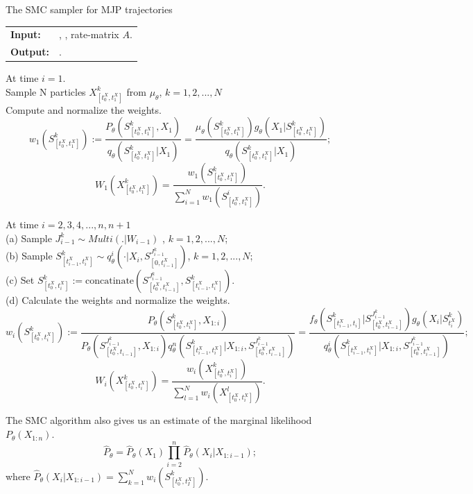 \begin{algorithm}[H]
  \caption{The SMC sampler for MJP trajectories}
   \label{alg:SMC}
  \begin{tabular}{l l}
   \textbf{Input:  } & \text{Prior $\pi_0$, observations $X$}, 
                       \text{Number of particles $N$}, rate-matrix $A$.\\
   \textbf{Output:  }& \text{New MJP trajectory $S' (t) = (s'_0, S', T')$}.\\
   \hline
   \end{tabular}
   \begin{algorithmic}[1]
\State At time $i = 1$.\\
\noindent Sample N particles $X_{[t_0^X, t_1^X]}^k$ from $\mu_\theta$, $k = 1,2,...,N$ \\
\noindent Compute and normalize the weights.
$$w_1(S_{[t_0^X, t_1^X]}^k) :=\frac{P_\theta(S_{[t_0^X, t_1^X]}^k, X_1)}{q_\theta(S_{[t_0^X, t_1^X]}^k|X_1)} =  \frac{\mu_\theta(S_{[t_0^X, t_1^X]}^k)g_\theta(X_1|S_{[t_0^X, t_1^X]}^k)}{q_\theta(S_{[t_0^X, t_1^X]}^k|X_1)};$$
$$W_1(X_{[t_0^X, t_1^X]}^k) = \frac{w_1(S_{[t_0^X, t_1^X]}^k)}{\sum_{i = 1}^N w_1(S_{[t_0^X, t_1^X]}^i)}.$$

\State At time $i = 2, 3, 4,..., n, n + 1$\\
\noindent \noindent (a) Sample $J_{i-1}^k \sim Multi(.| W_{i-1})$ , $k = 1,2,...,N$;\\
\noindent \noindent (b) Sample $S_{[t^X_{i -1},t^X_i]}^k \sim q_\theta^i(\cdot| X_i, S_{[0, t_{i-1}^X]}^{J_{i-1}^k})$, $k = 1,2,...,N$;\\
\noindent \noindent (c) Set $S_{[t_0^X, t^X_i]}^k := \text{concatinate}(S_{[t_0^X, t^X_{i-1}]}^{J_{i-1}^k}, S_{[t_{i -1}^X,t_i^X]}^k)$.\\
\noindent \noindent (d) Calculate the weights and normalize the weights.
$$w_i(S_{[t_0^X, t^X_i]}^k) := \frac{P_\theta(S_{[t_0^X, t_i^X]}^k, X_{1:i})}{P_\theta(S_{[t_0^X,t_{i-1}]}^{J_{i-1}^k}, X_{1:i})q_\theta^n(S_{[t^X_{i-1}, t_i^X]}^k | X_{1:i},S_{[t_0^X, t_{i-1}^X]}^{J_{i-1}^k} )} = \frac{f_\theta(S_{[t^X_{i-1}, t_i]}^k|S_{[t_0^X, t^X_{i-1}]}^{J_{i-1}^k}) g_\theta(X_i | S_{t_i^X}^k)}{q_\theta^i(S_{[t^X_{i-1}, t_i^X]}^k|X_{1:i},S_{[t_0^X, t^X_{i-1}]}^{J_{i-1}^k})};$$
$$W_i(X_{[t_0^X, t^X_i]}^k) = \frac{w_i(X_{[t_0^X, t_i^X]}^k)}{\sum_{l = 1}^N w_i(X_{[t_0^X, t^X_i]}^l)}.$$
\end{algorithmic}
\end{algorithm}
The SMC algorithm also gives us an estimate of the marginal likelihood $P_\theta(X_{1:n})$.
$$ \hat{P}_{\theta} = \hat{P}_{\theta}(X_1) \prod_{i = 2}^n \hat{P}_{\theta}(X_i| X_{1: i- 1});$$
where $\hat{P}_{\theta}(X_i| X_{1: i- 1}) = \sum_{k = 1} ^ N w_i(S_{[t_0^X, t_I^X]}^k).$
